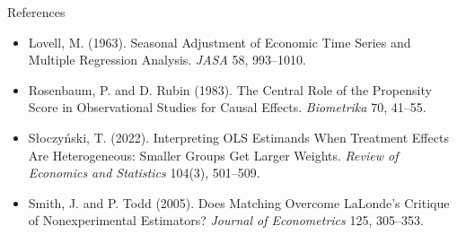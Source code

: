 \documentclass[
  11pt,
  ignorenonframetext,
  aspectratio=169,
]{beamer}
\begin{document}
\begin{frame}{References}
\begin{itemize}
  Programs with Experimental Data. \emph{AER} 76, 604--620.
\item
  Lovell, M. (1963). Seasonal Adjustment of Economic Time Series and
  Multiple Regression Analysis. \emph{JASA} 58, 993--1010.
\item
  Rosenbaum, P. and D. Rubin (1983). The Central Role of the Propensity
  Score in Observational Studies for Causal Effects. \emph{Biometrika}
  70, 41--55.
\item
  Słoczyński, T. (2022). Interpreting OLS Estimands When Treatment
  Effects Are Heterogeneous: Smaller Groups Get Larger Weights.
  \emph{Review of Economics and Statistics} 104(3), 501--509.
\item
  Smith, J. and P. Todd (2005). Does Matching Overcome LaLonde's
  Critique of Nonexperimental Estimators? \emph{Journal of Econometrics}
  125, 305--353.
\end{itemize}
\end{frame}
\end{document}
